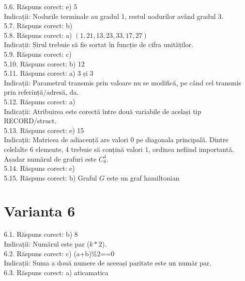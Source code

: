 5.6. Răspuns corect: e) 5\\
Indicații: Nodurile terminale au gradul 1, restul nodurilor având gradul 3.\\

5.7. Răspuns corect: b)\\

5.8. Răspuns corect: a) $(1,21,13,23,33,17,27)$\\
Indicații: Șirul trebuie să fie sortat în funcție de cifra unităților.\\

5.9. Răspuns corect: c)\\

5.10. Răspuns corect: b) 12\\

5.11. Răspuns corect: a) 3 și 3\\
Indicații: Parametrul transmis prin valoare nu se modifică, pe când cel transmis prin referință/adresă, da.\\

5.12. Răspuns corect: a)\\
Indicații: Atribuirea este corectă între două variabile de același tip RECORD/struct.\\

5.13. Răspuns corect: e) 15\\
Indicații: Matricea de adiacență are valori 0 pe diagonala principală. Dintre celelalte 6 elemente, 4 trebuie să conțină valori 1, ordinea nefiind importantă. Așadar numărul de grafuri este $C_{6}^{4}$.\\

5.14. Răspuns corect: e)\\

5.15. Răspuns corect: b) Graful $G$ este un graf hamiltonian

\section*{Varianta 6}

6.1. Răspuns corect: b) 8\\
Indicații: Numărul este par ($k*2$).\\

6.2. Răspuns corect: c) (a+b)\%2==0\\
Indicații: Suma a două numere de aceeași paritate este un număr par.\\

6.3. Răspuns corect: a) aticamatica\\

